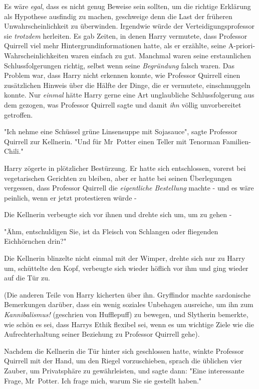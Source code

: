 {Es wäre \emph{egal}, dass es nicht genug Beweise sein sollten, um die richtige Erklärung als Hypothese ausfindig zu machen, geschweige denn die Last der früheren Unwahrscheinlichkeit zu überwinden. Irgendwie würde der Verteidigungsprofessor sie \emph{trotzdem} herleiten. Es gab Zeiten, in denen Harry vermutete, dass Professor Quirrell viel mehr Hintergrundinformationen hatte, als er erzählte, seine A-priori-Wahrscheinlichkeiten waren einfach zu gut. Manchmal waren seine erstaunlichen Schlussfolgerungen richtig, selbst wenn seine \emph{Begründung} falsch waren. Das Problem war, dass Harry nicht erkennen konnte, wie Professor Quirrell einen zusätzlichen Hinweis über die Hälfte der Dinge, die er vermutete, einschmuggeln konnte. Nur \emph{einmal} hätte Harry gerne eine Art unglaubliche Schlussfolgerung aus dem gezogen, was Professor Quirrell sagte und damit \emph{ihn} völlig unvorbereitet getroffen.

"Ich nehme eine Schüssel grüne Linsensuppe mit Sojasauce", sagte Professor Quirrell zur Kellnerin. "Und für Mr~Potter einen Teller mit Tenorman Familien-Chili."

Harry zögerte in plötzlicher Bestürzung. Er hatte sich entschlossen, vorerst bei vegetarischen Gerichten zu bleiben, aber er hatte bei seinen Überlegungen vergessen, dass Professor Quirrell die \emph{eigentliche Bestellung} machte - und es wäre peinlich, wenn er jetzt protestieren würde -

Die Kellnerin verbeugte sich vor ihnen und drehte sich um, um zu gehen -

"Ähm, entschuldigen Sie, ist da Fleisch von Schlangen oder fliegenden Eichhörnchen drin?"

Die Kellnerin blinzelte nicht einmal mit der Wimper, drehte sich nur zu Harry um, schüttelte den Kopf, verbeugte sich wieder höflich vor ihm und ging wieder auf die Tür zu.

(Die anderen Teile von Harry kicherten über ihn. Gryffindor machte sardonische Bemerkungen darüber, dass ein wenig soziales Unbehagen ausreiche, um ihn zum \emph{Kannibalismus!} (geschrien von Hufflepuff) zu bewegen, und Slytherin bemerkte, wie schön es sei, dass Harrys Ethik flexibel sei, wenn es um wichtige Ziele wie die Aufrechterhaltung seiner Beziehung zu Professor Quirrell gehe).

Nachdem die Kellnerin die Tür hinter sich geschlossen hatte, winkte Professor Quirrell mit der Hand, um den Riegel vorzuschieben, sprach die üblichen vier Zauber, um Privatsphäre zu gewährleisten, und sagte dann: "Eine interessante Frage, Mr~Potter. Ich frage mich, warum Sie sie gestellt haben."

}
